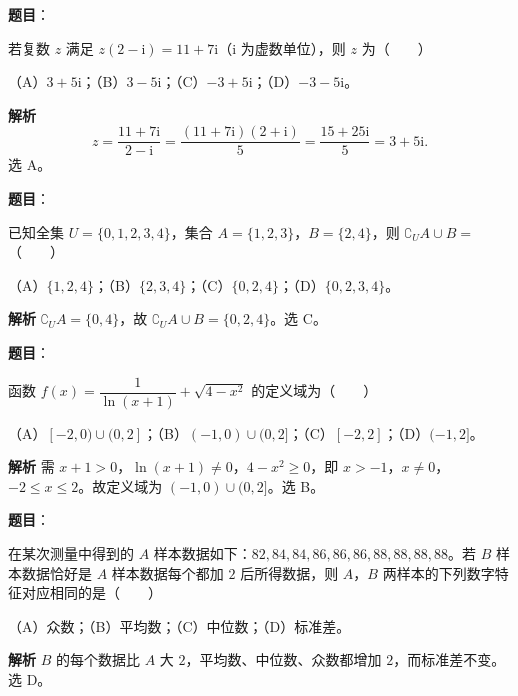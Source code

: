 
\begin{answer}

\textbf{题目}：

若复数 $z$ 满足 $z(2-\mathrm i)=11+7\mathrm i$（$\mathrm i$ 为虚数单位），则 $z$ 为\mbox{（　　）}

（A）$3+5\mathrm i$；（B）$3-5\mathrm i$；（C）$-3+5\mathrm i$；（D）$-3-5\mathrm i$。

\textbf{解析}
\nopagebreak[4]
\[z=\frac{11+7\mathrm i}{2-\mathrm i}=\frac{(11+7\mathrm i)(2+\mathrm i)}5=\frac{15+25\mathrm i}5=3+5\mathrm i.\]
选 A。


\end{answer}
\begin{answer}

\textbf{题目}：

已知全集 $U=\{0,1,2,3,4\}$，集合 $A=\{1,2,3\}$，$B=\{2,4\}$，则 $\complement_UA\cup B=$\mbox{（　　）}

（A）$\{1,2,4\}$；（B）$\{2,3,4\}$；（C）$\{0,2,4\}$；（D）$\{0,2,3,4\}$。

\textbf{解析}
$\complement_UA=\{0,4\}$，故 $\complement_UA\cup B=\{0,2,4\}$。选 C。


\end{answer}
\begin{answer}

\textbf{题目}：

函数 $f(x)=\dfrac1{\ln(x+1)}+\sqrt{4-x^2}$ 的定义域为\mbox{（　　）}

（A）$[-2,0)\cup(0,2]$；（B）$(-1,0)\cup(0,2]$；（C）$[-2,2]$；（D）$(-1,2]$。

\textbf{解析}
需 $x+1>0$，$\ln(x+1)\neq0$，$4-x^2\geqslant0$，即 $x>-1$，$x\neq0$，$-2\leqslant x\leqslant2$。故定义域为 $(-1,0)\cup(0,2]$。选 B。


\end{answer}
\begin{answer}

\textbf{题目}：

在某次测量中得到的 $A$ 样本数据如下：$82,84,84,86,86,86,88,88,88,88$。若 $B$ 样本数据恰好是 $A$ 样本数据每个都加 $2$ 后所得数据，则 $A$，$B$ 两样本的下列数字特征对应相同的是\mbox{（　　）}

（A）众数；（B）平均数；（C）中位数；（D）标准差。

\textbf{解析}
$B$ 的每个数据比 $A$ 大 $2$，平均数、中位数、众数都增加 $2$，而标准差不变。选 D。


\end{answer}
